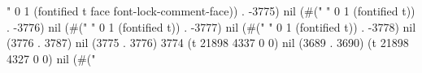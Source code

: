 " 0 1 (fontified t face font-lock-comment-face)) . -3775) nil (#("	" 0 1 (fontified t)) . -3776) nil (#(" " 0 1 (fontified t)) . -3777) nil (#(" " 0 1 (fontified t)) . -3778) nil (3776 . 3787) nil (3775 . 3776) 3774 (t 21898 4337 0 0) nil (3689 . 3690) (t 21898 4327 0 0) nil (#("%